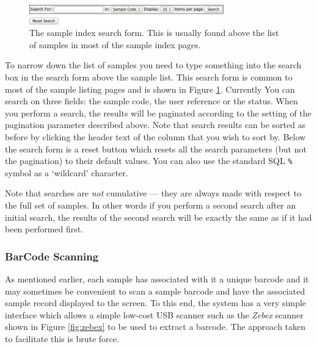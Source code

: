 \documentclass[12pt,twoside]{article}
\begin{document}
\begin{figure}[!h]
\begin{center}
\includegraphics[width=0.75\textwidth]{searchform}
\caption{The sample index search form. This is usually found
above the list of samples in most of the sample index pages.
\label{fig:searchform}}
\end{center}
\end{figure}

To narrow down the list of samples you need to type something into
the search box in the search form above the sample list. This search form
is common to most of the sample listing pages and is shown in
Figure \ref{fig:searchform}.
Currently You can search on three fields: 
the sample code, the user reference or the status. When you perform
a search, the results will be paginated according to the setting of the
pagination parameter described above. Note that search results can be
sorted as before by clicking the header text of the column that you
wish to sort by.
Below the search form is a reset button which resets all the search
parameters (but not the pagination) to their default values.
You can also use the standard SQL \verb=%= symbol as a `wildcard'
character.

\begin{plainblock}
Note that searches are \emph{not} cumulative --- they are always made
with respect to the full set of samples. In other words if you perform
a second search after an initial search, the results of the second search
will be exactly the same as if it had been performed first.
\end{plainblock}

\subsubsection{BarCode Scanning}
As mentioned earlier, each sample has associated with it a unique
barcode and it may sometimes be convenient to scan a sample barcode
and have the associated sample record displayed to the screen.
To this end, the system has a very simple interface which allows
a simple low-cost USB scanner such as the \emph{Zebex} scanner shown in 
Figure \ref{fig:zebex} to be used to extract a barcode.
The approach taken to facilitate this is brute force.
\end{document}
